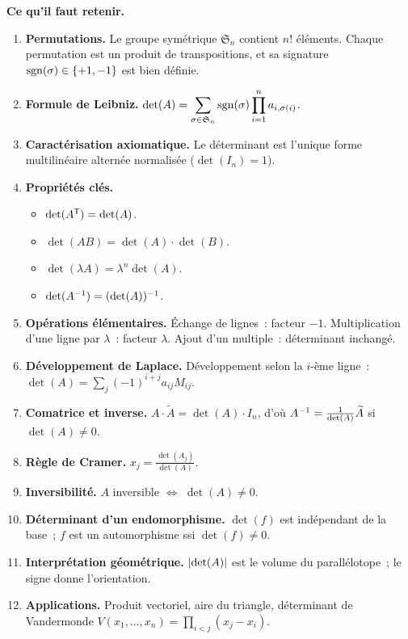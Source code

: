 \begin{framed}
\textbf{Ce qu'il faut retenir.}

\begin{enumerate}[label=\textbf{\arabic*.},leftmargin=2em]
  \item \textbf{Permutations.} Le groupe symétrique $\mathfrak{S}_n$
    contient $n!$ éléments. Chaque permutation est un produit de
    transpositions, et sa signature
    $\operatorname{sgn}(\sigma)\in\left\{+1,-1\right\}$ est bien définie.

  \item \textbf{Formule de Leibniz.}
    $\det(A)=\displaystyle\sum_{\sigma\in\mathfrak{S}_n}\operatorname{sgn}(\sigma)
    \prod_{i=1}^n a_{i,\sigma(i)}$.

  \item \textbf{Caractérisation axiomatique.} Le déterminant est
    l'unique forme multilinéaire alternée normalisée ($\det(I_n)=1$).

  \item \textbf{Propriétés clés.}
    \begin{itemize}
      \item $\det({A}^{\mathsf{T}})=\det(A)$.
      \item $\det(AB)=\det(A)\cdot\det(B)$.
      \item $\det(\lambda A)=\lambda^n\det(A)$.
      \item $\det({A}^{-1})=(\det(A))^{-1}$.
    \end{itemize}

  \item \textbf{Opérations élémentaires.} Échange de lignes~: facteur
    $-1$. Multiplication d'une ligne par $\lambda$~: facteur $\lambda$.
    Ajout d'un multiple~: déterminant inchangé.

  \item \textbf{Développement de Laplace.} Développement selon la
    $i$-ème ligne~: $\det(A)=\sum_j (-1)^{i+j}a_{ij}M_{ij}$.

  \item \textbf{Comatrice et inverse.}
    $A\cdot\widetilde{A}=\det(A)\cdot I_n$, d'où
    ${A}^{-1}=\frac{1}{\det(A)}\widetilde{A}$ si $\det(A)\neq 0$.

  \item \textbf{Règle de Cramer.} $x_j=\frac{\det(A_j)}{\det(A)}$.

  \item \textbf{Inversibilité.} $A$ inversible $\Leftrightarrow$
    $\det(A)\neq 0$.

  \item \textbf{Déterminant d'un endomorphisme.} $\det(f)$ est
    indépendant de la base~; $f$ est un automorphisme ssi $\det(f)\neq 0$.

  \item \textbf{Interprétation géométrique.} $\lvert\det(A)\rvert$ est le
    volume du parallélotope~; le signe donne l'orientation.

  \item \textbf{Applications.} Produit vectoriel, aire du triangle,
    déterminant de Vandermonde
    $V(x_1,\ldots,x_n)=\prod_{i<j}(x_j-x_i)$.
\end{enumerate}
\end{framed}
